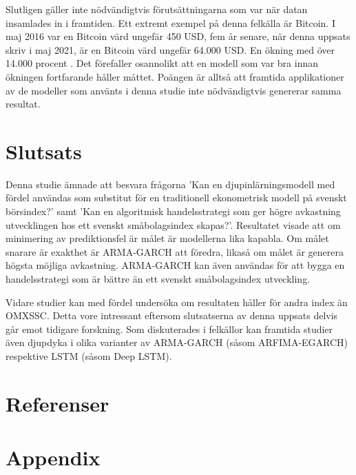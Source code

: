 \documentclass[11pt]{article}
\numberwithin{equation}{section}
\numberwithin{table}{section}
\numberwithin{figure}{section}
\begin{document}
Slutligen gäller inte nödvändigtvis förutsättningarna som var när datan insamlades in i framtiden. Ett extremt exempel på denna felkälla är Bitcoin. I maj 2016 var en Bitcoin värd ungefär 450 USD, fem år senare, när denna uppsats skriv i maj 2021, är en Bitcoin värd ungefär 64.000 USD. En ökning med över 14.000 procent \parencite{yahoo_bitcoin}. Det förefaller osannolikt att en modell som var bra innan ökningen fortfarande håller måttet. Poängen är alltså att framtida applikationer av de modeller som använts i denna studie inte nödvändigtvis genererar samma resultat.

\newpage
\section{Slutsats}
Denna studie ämnade att besvara frågorna 'Kan en djupinlärningsmodell med fördel användas som substitut för en traditionell ekonometrisk modell på svenskt börsindex?' samt 'Kan en algoritmisk handelsstrategi som ger högre avkastning utvecklingen hos ett svenskt småbolagsindex skapas?'. Resultatet visade att om minimering av prediktionsfel är målet är modellerna lika kapabla. Om målet snarare är exakthet är ARMA-GARCH att föredra, likaså om målet är generera högsta möjliga avkastning. ARMA-GARCH kan även användas för att bygga en handelsstrategi som är bättre än ett svenskt småbolagsindex utveckling.

Vidare studier kan med fördel undersöka om resultaten håller för andra index än OMXSSC. Detta vore intressant eftersom slutsatserna av denna uppsats delvis går emot tidigare forskning. Som diskuterades i felkällor kan framtida studier även djupdyka i olika varianter av ARMA-GARCH (såsom ARFIMA-EGARCH) respektive LSTM (såsom Deep LSTM).



\newpage
\section*{Referenser}
\printbibliography[heading=none]



\newpage

\appendix
\section*{Appendix}
\renewcommand{\thesubsection}{\Alph{subsection}}
\end{document}
